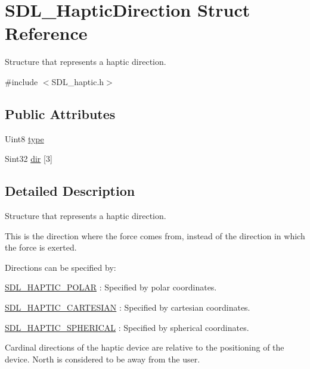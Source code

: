 \hypertarget{struct_s_d_l___haptic_direction}{}\section{S\+D\+L\+\_\+\+Haptic\+Direction Struct Reference}
\label{struct_s_d_l___haptic_direction}


Structure that represents a haptic direction.  




{\ttfamily \#include $<$S\+D\+L\+\_\+haptic.\+h$>$}

\subsection*{Public Attributes}
\begin{DoxyCompactItemize}
\item 
Uint8 \mbox{\hyperlink{struct_s_d_l___haptic_direction_acd6830ad68c4ba2af16057fa418087cc}{type}}
\item 
Sint32 \mbox{\hyperlink{struct_s_d_l___haptic_direction_a6cebd8118a3e61e36bd0c503ae020362}{dir}} \mbox{[}3\mbox{]}
\end{DoxyCompactItemize}


\subsection{Detailed Description}
Structure that represents a haptic direction. 

This is the direction where the force comes from, instead of the direction in which the force is exerted.

Directions can be specified by\+:
\begin{DoxyItemize}
\item \mbox{\hyperlink{_s_d_l__haptic_8h_acdc35e97e5525472054a67b76e518f3b}{S\+D\+L\+\_\+\+H\+A\+P\+T\+I\+C\+\_\+\+P\+O\+L\+AR}} \+: Specified by polar coordinates.
\item \mbox{\hyperlink{_s_d_l__haptic_8h_af8b2430a363a968de2a5b64c8f663d3b}{S\+D\+L\+\_\+\+H\+A\+P\+T\+I\+C\+\_\+\+C\+A\+R\+T\+E\+S\+I\+AN}} \+: Specified by cartesian coordinates.
\item \mbox{\hyperlink{_s_d_l__haptic_8h_a1fcf7cb0eaf3c39b16ba266054e25aff}{S\+D\+L\+\_\+\+H\+A\+P\+T\+I\+C\+\_\+\+S\+P\+H\+E\+R\+I\+C\+AL}} \+: Specified by spherical coordinates.
\end{DoxyItemize}

Cardinal directions of the haptic device are relative to the positioning of the device. North is considered to be away from the user.

